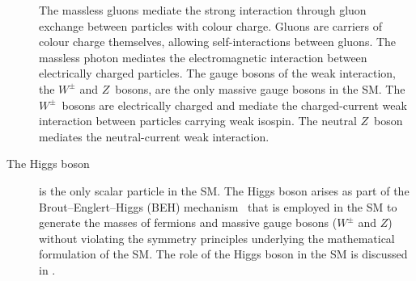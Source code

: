 \begin{description}
  The massless gluons mediate the strong interaction through gluon exchange
  between particles with colour charge. Gluons are carriers of colour charge
  themselves, allowing self-interactions between gluons. The massless photon
  mediates the electromagnetic interaction between electrically charged
  particles. The gauge bosons of the weak interaction, the $W^\pm$ and
  $Z$~bosons, are the only massive gauge bosons in the SM. The $W^\pm$~bosons
  are electrically charged and mediate the charged-current weak interaction
  between particles carrying weak isospin. The neutral $Z$~boson mediates the
  neutral-current weak interaction.

\item[The Higgs boson] is the only scalar particle in the SM. The Higgs boson
  arises as part of the Brout--Englert--Higgs (BEH)
  mechanism~\cite{Englert:1964et,Higgs:1964pj} that is employed in the SM to
  generate the masses of fermions and massive gauge bosons ($W^\pm$ and $Z$)
  without violating the symmetry principles underlying the mathematical
  formulation of the SM. The role of the Higgs boson in the SM is discussed in
  .

\end{description}

